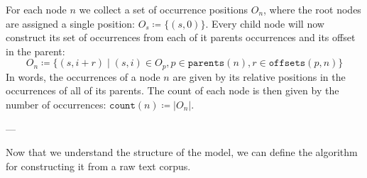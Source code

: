 For each node $n$ we collect a set of occurrence positions $O_n$, where the root nodes are assigned a single position: $O_s \coloneqq \{(s, 0)\}$. Every child node will now construct its set of occurrences from each of it parents occurrences and its offset in the parent:
\[
    O_n \coloneqq \{ (s, i + r) \mid (s, i) \in O_p, p \in \texttt{parents}(n), r \in
    \texttt{offsets}(p, n)\}
\]
In words, the occurrences of a node $n$ are given by its relative positions in the occurrences of all of its parents. The count of each node is then given by the number of occurrences: $\texttt{count}(n) \coloneqq |O_n|$.


\begin{center}
    ---
\end{center}
\noindent
Now that we understand the structure of the model, we can define the algorithm for constructing it from a raw text corpus.

%

